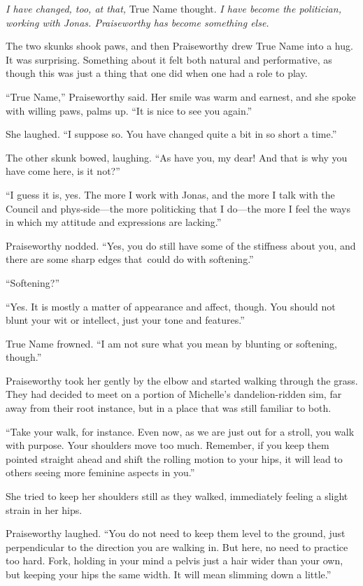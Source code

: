 \emph{I have changed, too, at that,} True Name thought. \emph{I have become the politician, working with Jonas. Praiseworthy has become something else.}

The two skunks shook paws, and then Praiseworthy drew True Name into a hug. It was surprising. Something about it felt both natural and performative, as though this was just a thing that one did when one had a role to play.

``True Name,'' Praiseworthy said. Her smile was warm and earnest, and she spoke with willing paws, palms up. ``It is nice to see you again.''

She laughed. ``I suppose so. You have changed quite a bit in so short a time.''

The other skunk bowed, laughing. ``As have you, my dear! And that is why you have come here, is it not?''

``I guess it is, yes. The more I work with Jonas, and the more I talk with the Council and phys-side---the more politicking that I do---the more I feel the ways in which my attitude and expressions are lacking.''

Praiseworthy nodded. ``Yes, you do still have some of the stiffness about you, and there are some sharp edges that\pagebreak\ could do with softening.''

``Softening?''

``Yes. It is mostly a matter of appearance and affect, though. You should not blunt your wit or intellect, just your tone and features.''

True Name frowned. ``I am not sure what you mean by blunting or softening, though.''

Praiseworthy took her gently by the elbow and started walking through the grass. They had decided to meet on a portion of Michelle's dandelion-ridden sim, far away from their root instance, but in a place that was still familiar to both.

``Take your walk, for instance. Even now, as we are just out for a stroll, you walk with purpose. Your shoulders move too much. Remember, if you keep them pointed straight ahead and shift the rolling motion to your hips, it will lead to others seeing more feminine aspects in you.''

She tried to keep her shoulders still as they walked, immediately feeling a slight strain in her hips.

Praiseworthy laughed. ``You do not need to keep them level to the ground, just perpendicular to the direction you are walking in. But here, no need to practice too hard. Fork, holding in your mind a pelvis just a hair wider than your own, but keeping your hips the same width. It will mean slimming down a little.''

